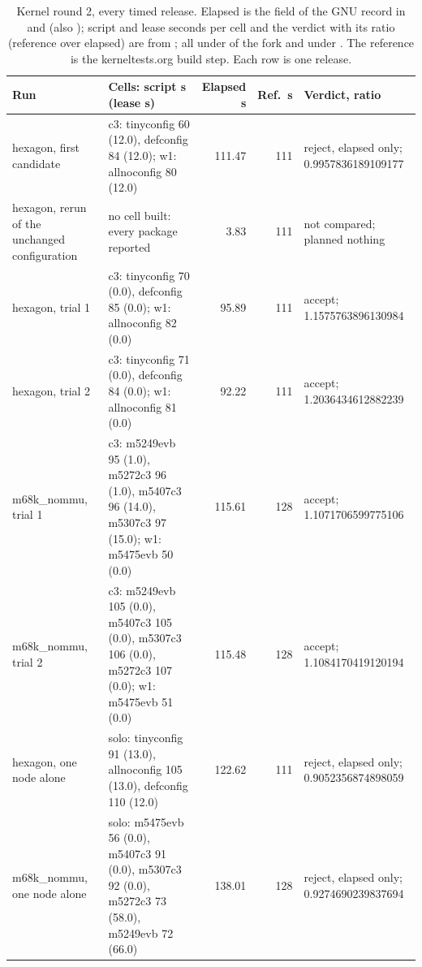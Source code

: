 \begin{table}[ht]
\centering\footnotesize
\caption{Kernel round 2, every timed release. Elapsed is the 
field of the GNU  record in \protect{} and
\protect{} (also \protect{}); script and
lease seconds per cell and the  verdict with its
 ratio (reference over elapsed) are from
\protect{}; all under \protect{} of
the fork and under
\protect{}.
The reference is the kerneltests.org build step. Each row is one release.}
\label{tab:eval:kernel2}
\begin{tabular}{@{}L{2.4cm}L{4.9cm}rrL{3.3cm}@{}}
\toprule
Run & Cells: script s (lease s) & Elapsed s & Ref.\ s & Verdict, ratio \\
\midrule
hexagon, first candidate & c3: tinyconfig 60 (12.0), defconfig 84 (12.0);
w1: allnoconfig 80 (12.0) & 111.47 & 111 & reject, elapsed only;
0.9957836189109177 \\
hexagon, rerun of the unchanged configuration & no cell built: every package
reported  & 3.83 & 111 & not compared; planned nothing \\
hexagon, trial 1 & c3: tinyconfig 70 (0.0), defconfig 85 (0.0); w1: allnoconfig
82 (0.0) & 95.89 & 111 & accept; 1.1575763896130984 \\
hexagon, trial 2 & c3: tinyconfig 71 (0.0), defconfig 84 (0.0); w1: allnoconfig
81 (0.0) & 92.22 & 111 & accept; 1.2036434612882239 \\
m68k\_nommu, trial 1 & c3: m5249evb 95 (1.0), m5272c3 96 (1.0), m5407c3 96
(14.0), m5307c3 97 (15.0); w1: m5475evb 50 (0.0) & 115.61 & 128 & accept;
1.1071706599775106 \\
m68k\_nommu, trial 2 & c3: m5249evb 105 (0.0), m5407c3 105 (0.0), m5307c3 106
(0.0), m5272c3 107 (0.0); w1: m5475evb 51 (0.0) & 115.48 & 128 & accept;
1.1084170419120194 \\
hexagon, one node alone & solo: tinyconfig 91 (13.0), allnoconfig 105 (13.0),
defconfig 110 (12.0) & 122.62 & 111 & reject, elapsed only;
0.9052356874898059 \\
m68k\_nommu, one node alone & solo: m5475evb 56 (0.0), m5407c3 91 (0.0),
m5307c3 92 (0.0), m5272c3 73 (58.0), m5249evb 72 (66.0) & 138.01 & 128 &
reject, elapsed only; 0.9274690239837694 \\
\bottomrule
\end{tabular}
\end{table}

